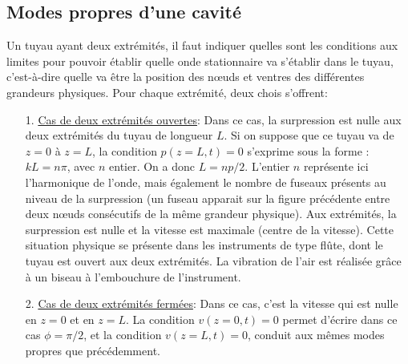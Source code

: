 \documentclass[a4paper, 12pt]{article}
\begin{document}
\subsection{Modes propres d'une cavité}

Un tuyau ayant deux extrémités, il faut indiquer quelles sont les conditions aux limites pour pouvoir établir quelle onde stationnaire va s'établir dans le tuyau, c'est-à-dire quelle va être la position des nœuds et ventres des différentes grandeurs physiques. Pour chaque extrémité, deux chois s'offrent:

\noindent{}

\begin{itemize}
\item[1.] \underline{Cas de deux extrémités ouvertes}: Dans ce cas, la surpression est nulle aux deux extrémités du tuyau de longueur $L$. Si on suppose que ce tuyau va de $z = 0$ à $z = L$, la condition $p(z=L,t)=0$ s'exprime sous la forme : $kL=n\pi$, avec $n$ entier. On a donc $L=np/2$. L'entier $n$ représente ici l'harmonique de l'onde, mais également le nombre de fuseaux présents au niveau de la surpression (un fuseau apparait sur la figure précédente entre deux nœuds consécutifs de la même grandeur physique). Aux extrémités, la surpression est nulle et la vitesse est maximale (centre de la vitesse).
Cette situation physique se présente dans les instruments de type flûte, dont le tuyau est ouvert aux deux extrémités. La vibration de l'air est réalisée grâce à un biseau à l'embouchure de l'instrument.
\item[2.] \underline{Cas de deux extrémités fermées}: Dans ce cas, c'est la vitesse qui est nulle en $z=0$ et en $z=L$. La condition $v(z=0,t)=0$ permet d'écrire dans ce cas $\phi = \pi /2$, et la condition $v(z=L,t)=0$, conduit aux mêmes modes propres que précédemment.
\end{itemize}
\end{document}
